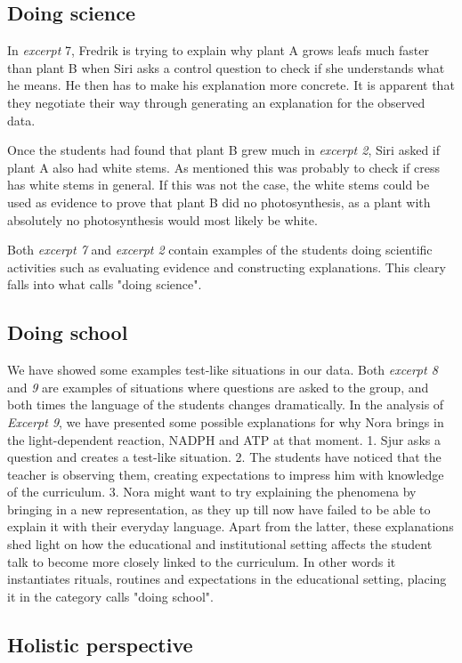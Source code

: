 \subsection{Doing science}
In \emph{excerpt} 7, Fredrik is trying to explain why plant A grows leafs much faster than plant B when Siri asks a control question to check if she understands what he means. He then has to make his explanation more concrete. It is apparent that they negotiate their way through generating an explanation for the observed data. 

Once the students had found that plant B grew much in \emph{excerpt 2}, Siri asked if plant A also had white stems. As mentioned this was probably to check if cress has white stems in general. If this was not the case, the white stems could be used as evidence to prove that plant B did no photosynthesis, as a plant with absolutely no photosynthesis would most likely be white. 

Both \emph{excerpt 7} and \emph{excerpt 2} contain examples of the students doing scientific activities such as evaluating evidence and constructing explanations. This cleary falls into what \citet{jimenez2000doing} calls "doing science". 

\subsection{Doing school}
We have showed some examples test-like situations in our data. Both \emph{excerpt 8} and \emph{9} are examples of situations where questions are asked to the group, and both times the language of the students changes dramatically. In the analysis of \emph{Excerpt 9}, we have presented some possible explanations for why Nora brings in the light-dependent reaction, NADPH and ATP at that moment. 1. Sjur asks a question and creates a test-like situation. 2. The students have noticed that the teacher is observing them, creating expectations to impress him with knowledge of the curriculum. 3. Nora might want to try explaining the phenomena by bringing in a new representation, as they up till now have failed to be able to explain it with their everyday language. Apart from the latter, these explanations shed light on how the educational and institutional setting affects the student talk to become more closely linked to the curriculum. In other words it instantiates rituals, routines and expectations in the educational setting, placing it in the category \citet{jimenez2000doing} calls "doing school". 

\subsection{Holistic perspective}



